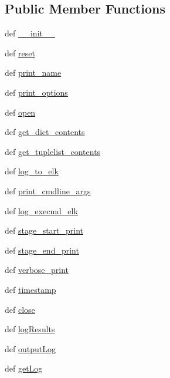 \subsection*{Public Member Functions}
\begin{DoxyCompactItemize}
\item 
def \hyperlink{class_logger_1_1_logger_aff6a8050c4529cf59be26d70e487aba9}{\-\_\-\-\_\-init\-\_\-\-\_\-}
\item 
def \hyperlink{class_logger_1_1_logger_a13e2a87babf570a4524a9a0e505ba396}{reset}
\item 
def \hyperlink{class_logger_1_1_logger_a3ec2e17d92bb034c1e4f1e11ec7c2522}{print\-\_\-name}
\item 
def \hyperlink{class_logger_1_1_logger_aa6ca87386f752414ada5cc84daa1bfd4}{print\-\_\-options}
\item 
def \hyperlink{class_logger_1_1_logger_a009dfacca4ae352cc05a7e8307d8ecb5}{open}
\item 
def \hyperlink{class_logger_1_1_logger_a10141d585df905bec94bedf85a8eb976}{get\-\_\-dict\-\_\-contents}
\item 
def \hyperlink{class_logger_1_1_logger_a51264c10e6b8e89921d3e9f1f803a350}{get\-\_\-tuplelist\-\_\-contents}
\item 
def \hyperlink{class_logger_1_1_logger_a53feff6c78d09121c2e4c182ff23fade}{log\-\_\-to\-\_\-elk}
\item 
def \hyperlink{class_logger_1_1_logger_a3779c396f867ec4bd7ec73864990e8de}{print\-\_\-cmdline\-\_\-args}
\item 
def \hyperlink{class_logger_1_1_logger_a0281731e015daa616068ea2e3b0d6810}{log\-\_\-execmd\-\_\-elk}
\item 
def \hyperlink{class_logger_1_1_logger_a10165baedbbebdc49c449237e518edb8}{stage\-\_\-start\-\_\-print}
\item 
def \hyperlink{class_logger_1_1_logger_a2f203cbc01e4de98b5eab3e5c9d9709f}{stage\-\_\-end\-\_\-print}
\item 
def \hyperlink{class_logger_1_1_logger_a8c05e25fb36679fae21ab8910eb6d117}{verbose\-\_\-print}
\item 
def \hyperlink{class_logger_1_1_logger_abdeac14fe7d313f6a4d2788ec7652ce2}{timestamp}
\item 
def \hyperlink{class_logger_1_1_logger_a8ee3d433a755c789820bd9188824debc}{close}
\item 
def \hyperlink{class_logger_1_1_logger_a119a7a5e59e77d9cced01057bdd8d493}{log\-Results}
\item 
def \hyperlink{class_logger_1_1_logger_ac50b7479c5c0f15b94ae311774600cd7}{output\-Log}
\item 
def \hyperlink{class_logger_1_1_logger_af565e7da19e56f4f4ff0e1f88b172394}{get\-Log}
\end{DoxyCompactItemize}
